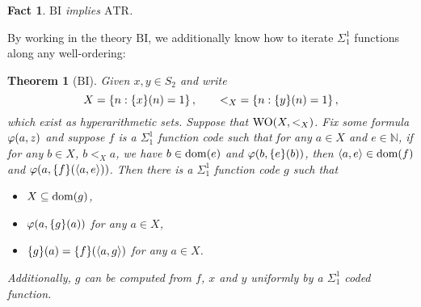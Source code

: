 \documentclass[11pt]{article}
\theoremstyle{plain}
\newtheorem{theorem}{Theorem}[section]
\newtheorem*{fact*}{Fact}
\theoremstyle{definition}
\newcommand{\tuple}[1]{\left\langle #1 \right\rangle}
\DeclareMathOperator{\dom}{dom}
\DeclareMathOperator{\WO}{WO}
\begin{document}
\begin{fact*}
    $\mathrm{BI}$ implies $\mathrm{ATR}$.
\end{fact*}

By working in the theory $\mathrm{BI}$, we additionally know how to iterate $\Sigma^1_1$ functions along any well-ordering:

\begin{theorem}[$\mathrm{BI}$]
    Given $x, y \in S_2$ and write
    \[X = \left\{n : \mleft\{x\mright\}\mleft(n\mright) = 1\right\}, \qquad {<_X} = \left\{n : \mleft\{y\mright\}\mleft(n\mright) = 1\right\},\]
    which exist as hyperarithmetic sets. Suppose that $\WO\mleft(X, {<_X}\mright)$. Fix some formula $\varphi\mleft(a, z\mright)$ and suppose $f$ is a $\Sigma^1_1$ function code such that for any $a \in X$ and $e \in \mathbb{N}$, if for any $b \in X$, $b <_X a$, we have $b \in \dom\mleft(e\mright)$ and $\varphi\mleft(b, \mleft\{e\mright\}\mleft(b\mright)\mright)$, then $\tuple{a, e} \in \dom\mleft(f\mright)$ and $\varphi\mleft(a, \mleft\{f\mright\}\mleft(\tuple{a, e}\mright)\mright)$. Then there is a $\Sigma^1_1$ function code $g$ such that
    \begin{itemize}
        \item $X \subseteq \dom\mleft(g\mright)$,
        \item $\varphi\mleft(a, \mleft\{g\mright\}\mleft(a\mright)\mright)$ for any $a \in X$,
        \item $\mleft\{g\mright\}\mleft(a\mright) = \mleft\{f\mright\}\mleft(\tuple{a, g}\mright)$ for any $a \in X$.
    \end{itemize}
    Additionally, $g$ can be computed from $f$, $x$ and $y$ uniformly by a $\Sigma^1_1$ coded function.
\end{theorem}
\end{document}
